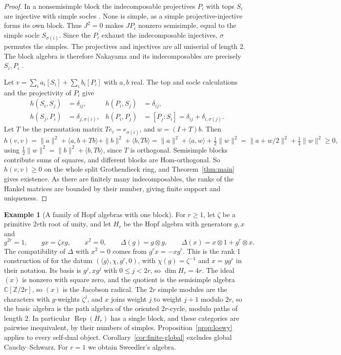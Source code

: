 \documentclass[11pt,reqno]{amsart}
\theoremstyle{definition}
\newtheorem{example}[theorem]{Example}
\newcommand{\CC}{\mathbb C}
\newcommand{\ZZ}{\mathbb Z}
\newcommand{\Rep}{\operatorname{Rep}}
\begin{document}
\begin{proof}
In a nonsemisimple block the indecomposable projectives $P_i$ with tops $S_i$ are injective with simple socles \cite[Proposition~6.1.3 and Remark~6.1.5]{EGNO}. None is simple, as a simple projective-injective forms its own block. Thus $J^2=0$ makes $JP_i$ nonzero semisimple, equal to the simple socle $S_{\sigma(i)}$. Since the $P_i$ exhaust the indecomposable injectives, $\sigma$ permutes the simples. The projectives and injectives are all uniserial of length 2. The block algebra is therefore Nakayama and its indecomposables are precisely $S_i,P_i$ \cite[Theorem~VI.2.1]{ARS}.

Let $v=\sum_ia_i[S_i]+\sum_ib_i[P_i]$ with $a,b$ real. The top and socle calculations and the projectivity of $P_i$ give
\[
\begin{aligned}
 h(S_i,S_j)&=\delta_{ij}, & h(P_i,S_j)&=\delta_{ij},\\
 h(S_j,P_i)&=\delta_{j,\sigma(i)}, & h(P_i,P_j)&=[P_j:S_i]=\delta_{ij}+\delta_{i,\sigma(j)} .
\end{aligned}
\] Let $T$ be the permutation matrix $Te_i=e_{\sigma(i)}$, and $w=(I+T)b$. Then
\[
 h(v,v)=\|a\|^2+\langle a,b+Tb\rangle+\|b\|^2+\langle b,Tb\rangle
        =\|a\|^2+\langle a,w\rangle+\tfrac12\|w\|^2
        =\|a+w/2\|^2+\tfrac14\|w\|^2\geq0,
\]
using $\frac12\|w\|^2=\|b\|^2+\langle b,Tb\rangle$, since $T$ is orthogonal. Semisimple blocks contribute sums of squares, and different blocks are Hom-orthogonal. So $h(v,v)\geq0$ on the whole split Grothendieck ring, and Theorem~\ref{thm:main} gives existence. As there are finitely many indecomposables, the ranks of the Hankel matrices are bounded by their number, giving finite support and uniqueness.
\end{proof}

\begin{example}[A family of Hopf algebras with one block]\label{ex:exterior}
For $r\geq1$, let $\zeta$ be a primitive $2r$th root of unity, and let $H_r$ be the Hopf algebra with generators $g,x$ and
\[
 g^{2r}=1,\qquad gx=\zeta xg,\qquad x^2=0,
 \qquad \Delta(g)=g\otimes g,\qquad
 \Delta(x)=x\otimes1+g^r\otimes x .
\]
The compatibility of $\Delta$ with $x^2=0$ comes from $g^rx=-xg^r$. This is the rank 1 construction of \cite[\S2]{WHLZ} for the datum $(\langle g\rangle,\chi,g^r,0)$, with $\chi(g)=\zeta^{-1}$ and $x=yg^r$ in their notation. Its basis is $g^j,xg^j$ with $0\leq j<2r$, so $\dim H_r=4r$. The ideal $(x)$ is nonzero with square zero, and the quotient is the semisimple algebra $\CC[\ZZ/2r]$, so $(x)$ is the Jacobson radical. The $2r$ simple modules are the characters with $g$-weights $\zeta^j$, and $x$ joins weight $j$ to weight $j+1$ modulo $2r$, so the basic algebra is the path algebra of the oriented $2r$-cycle, modulo paths of length 2. In particular $\Rep(H_r)$ has a single block, and these categories are pairwise inequivalent, by their numbers of simples. Proposition~\ref{prop:loewy} applies to every self-dual object. Corollary~\ref{cor:finite-global} excludes global Cauchy--Schwarz. For $r=1$ we obtain Sweedler's algebra.
\end{example}
\end{document}
